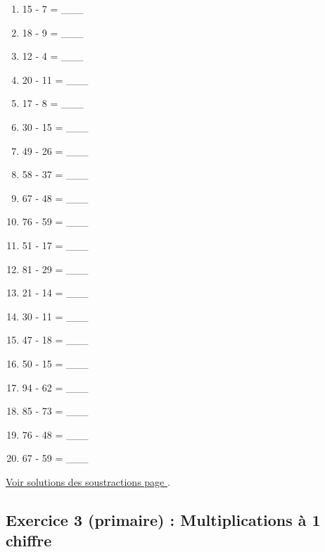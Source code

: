 \label{calc:niveau2}

\begin{enumerate}[label=C\arabic*)]
    \item 15 - 7 = \_\_\_
    \item 18 - 9 = \_\_\_
    \item 12 - 4 = \_\_\_
    \item 20 - 11 = \_\_\_
    \item 17 - 8 = \_\_\_
    \item 30 - 15 = \_\_\_
    \item 49 - 26 = \_\_\_
    \item 58 - 37 = \_\_\_
    \item 67 - 48 = \_\_\_
    \item 76 - 59 = \_\_\_
    \item 51 - 17 = \_\_\_
    \item 81 - 29 = \_\_\_
    \item 21 - 14 = \_\_\_
    \item 30 - 11 = \_\_\_
    \item 47 - 18 = \_\_\_
    \item 50 - 15 = \_\_\_
    \item 94 - 62 = \_\_\_
    \item 85 - 73 = \_\_\_
    \item 76 - 48 = \_\_\_
    \item 67 - 59 = \_\_\_
\end{enumerate}

\hyperref[sol:niveau2]{Voir solutions des soustractions page \pageref{sol:niveau2}}.

\newpage


\subsection{Exercice 3 (primaire) : Multiplications à 1 chiffre}


\label{calc:niveau3}

